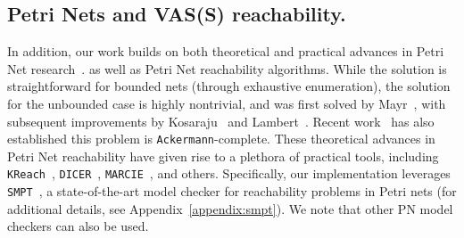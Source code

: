 \subsection{Petri Nets and VAS(S) reachability.}
\label{sec:related:petri}

In addition, our work builds on both theoretical and practical advances in 
Petri Net research~\cite{Mu89, Es96, Re12, EsNi24}. 
%
as well as Petri Net reachability algorithms. While the solution is 
straightforward for bounded nets (through exhaustive enumeration), the solution 
for the unbounded case is highly nontrivial, and was first solved by 
Mayr~\cite{Ma81}, with subsequent improvements by Kosaraju~\cite{Ko82} and 
Lambert~\cite{La92}. Recent work~\cite{CzWo22} has also established this 
problem is \texttt{Ackermann}-complete.
%
These theoretical advances in Petri Net reachability have given rise to a 
plethora of practical tools, including \texttt{KReach}~\cite{DiLa20}, 
\texttt{DICER}~\cite{XiZhLi21}, \texttt{MARCIE}~\cite{HeRoSc13}, and others. 
%
Specifically, our implementation leverages \texttt{SMPT}~\cite{AmDa23}, a state-of-the-art model checker for reachability problems in Petri nets (for additional details, see Appendix~\ref{appendix:smpt}). We note that other PN model checkers can also be used.





